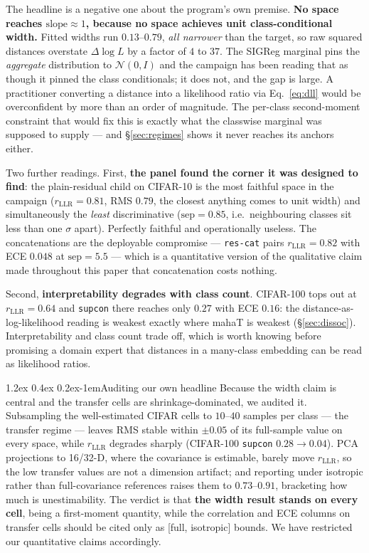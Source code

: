 \documentclass{article}
\makeatletter
\renewcommand\paragraph{\@startsection{paragraph}{4}{\z@}%
  {1.2ex \@plus 0.4ex \@minus 0.2ex}{-1em}{\normalsize\bf}}
\newcommand{\N}{\mathcal{N}}
\makeatother
\begin{document}
The headline is a negative one about the program's own premise.
\textbf{No space reaches $\mathrm{slope}\approx1$, because no space achieves
unit class-conditional width.} Fitted widths run $0.13$--$0.79$, \emph{all
narrower} than the target, so raw squared distances overstate $\Delta\log L$ by
a factor of $4$ to $37$. The SIGReg marginal pins the \emph{aggregate}
distribution to $\N(0,I)$ and the campaign has been reading that as though it
pinned the class conditionals; it does not, and the gap is large. A practitioner
converting a distance into a likelihood ratio via Eq.~\eqref{eq:dll} would be
overconfident by more than an order of magnitude. The per-class second-moment
constraint that would fix this is exactly what the classwise marginal was
supposed to supply --- and \S\ref{sec:regimes} shows it never reaches its
anchors either.

Two further readings. First, \textbf{the panel found the corner it was designed
to find}: the plain-residual child on CIFAR-10 is the most faithful space in the
campaign ($r_{\mathrm{LLR}}=0.81$, RMS $0.79$, the closest anything comes to
unit width) and simultaneously the \emph{least} discriminative
($\mathrm{sep}=0.85$, i.e.\ neighbouring classes sit less than one $\sigma$
apart). Perfectly faithful and operationally useless. The concatenations are the
deployable compromise --- \texttt{res-cat} pairs $r_{\mathrm{LLR}}=0.82$ with
ECE $0.048$ at $\mathrm{sep}=5.5$ --- which is a quantitative version of the
qualitative claim made throughout this paper that concatenation costs nothing.

Second, \textbf{interpretability degrades with class count}. CIFAR-100 tops out
at $r_{\mathrm{LLR}}=0.64$ and \texttt{supcon} there reaches only $0.27$ with
ECE $0.16$: the distance-as-log-likelihood reading is weakest exactly where
mahaT is weakest (\S\ref{sec:dissoc}). Interpretability and class count trade
off, which is worth knowing before promising a domain expert that distances in a
many-class embedding can be read as likelihood ratios.

\paragraph{Auditing our own headline}
Because the width claim is central and the transfer cells are
shrinkage-dominated, we audited it. Subsampling the well-estimated CIFAR cells
to $10$--$40$ samples per class --- the transfer regime --- leaves RMS stable
within $\pm0.05$ of its full-sample value on every space, while
$r_{\mathrm{LLR}}$ degrades sharply (CIFAR-100 \texttt{supcon}
$0.28\to0.04$). PCA projections to 16/32-D, where the covariance is estimable,
barely move $r_{\mathrm{LLR}}$, so the low transfer values are not a dimension
artifact; and reporting under isotropic rather than full-covariance references
raises them to $0.73$--$0.91$, bracketing how much is unestimability. The
verdict is that \textbf{the width result stands on every cell}, being a
first-moment quantity, while the correlation and ECE columns on transfer cells
should be cited only as [full, isotropic] bounds. We have restricted our
quantitative claims accordingly.
\end{document}
